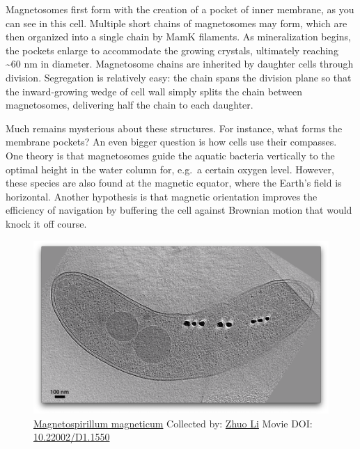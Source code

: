 \documentclass[]{tufte-book}
\begin{document}
Magnetosomes first form with the creation of a pocket of inner membrane,
as you can see in this cell. Multiple short chains of magnetosomes may
form, which are then organized into a single chain by MamK filaments. As
mineralization begins, the pockets enlarge to accommodate the growing
crystals, ultimately reaching \textasciitilde{}60 nm in diameter.
Magnetosome chains are inherited by daughter cells through division.
Segregation is relatively easy: the chain spans the division plane so
that the inward-growing wedge of cell wall simply splits the chain
between magnetosomes, delivering half the chain to each daughter.

Much remains mysterious about these structures. For instance, what forms
the membrane pockets? An even bigger question is how cells use their
compasses. One theory is that magnetosomes guide the aquatic bacteria
vertically to the optimal height in the water column for, e.g.~a certain
oxygen level. However, these species are also found at the magnetic
equator, where the Earth's field is horizontal. Another hypothesis is
that magnetic orientation improves the efficiency of navigation by
buffering the cell against Brownian motion that would knock it off
course.





\begin{figure}
\includegraphics{movie_stills/7_6} \caption[\protect\hyperlink{tree}{Magnetospirillum magneticum}
Collected by: \protect\hyperlink{zhuo_li}{Zhuo Li} Movie DOI:
\href{https://doi.org/10.22002/D1.1550}{10.22002/D1.1550}]{\protect\hyperlink{tree}{Magnetospirillum magneticum}
Collected by: \protect\hyperlink{zhuo_li}{Zhuo Li} Movie DOI:
\href{https://doi.org/10.22002/D1.1550}{10.22002/D1.1550}}\label{fig:7-6}
\end{figure}
\end{document}
